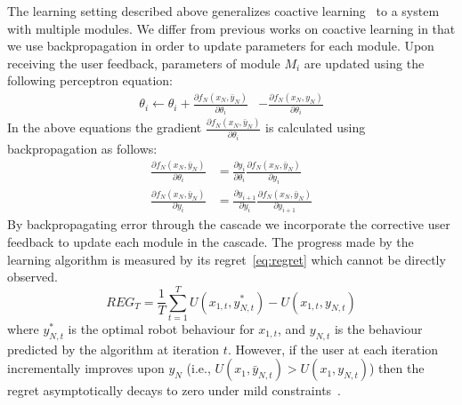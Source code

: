 The learning setting described above generalizes coactive learning~\citep{Jain13,Shivaswamy12} to a system with multiple modules. We differ from previous works on coactive learning in that we use  backpropagation in order to update parameters for each module. Upon receiving the user feedback, parameters of module $M_i$ are updated using the following perceptron equation:  
\begin{align}
\theta_i \leftarrow \theta_i +  \frac{\partial f_N(x_N,\bar{y}_N)}{\partial \theta_i} &- \frac{\partial f_N(x_N,{y}_N)}{\partial \theta_i}
\end{align}
In the above equations the	 gradient $\frac{\partial f_N(x_N,\bar{y}_N)}{\partial \theta_i}$ is calculated using backpropagation as follows:
\begin{align}
\frac{\partial f_N(x_N,\bar{y}_N)}{\partial \theta_i} &= \frac{\partial y_i}{\partial \theta_i}  \frac{\partial f_N(x_N,\bar{y}_N)	}{\partial y_{i}}\\
\frac{\partial f_N(x_N,\bar{y}_N)	}{\partial y_{i}} &= \frac{\partial y_{i+1}	}{\partial y_{i}} \frac{\partial f_N(x_N,\bar{y}_N)	}{\partial y_{i+1}}
\end{align}
By backpropagating error through the cascade we  incorporate the corrective user feedback to update each module in the cascade. The progress made by the learning algorithm is measured by its regret~\eqref{eq:regret} which cannot be directly observed.
\begin{equation}
\label{eq:regret}
REG_T = \frac{1}{T}\sum_{t=1}^T U(x_{1,t},y_{N,t}^*) - U(x_{1,t},y_{N,t}) 
\end{equation}
where $y_{N,t}^*$ is the optimal robot behaviour for $x_{1,t}$, and $y_{N,t}$ is the behaviour predicted by the algorithm at iteration $t$.  However, if the user at each iteration incrementally improves upon $y_N$ (i.e., $U(x_1,\bar{y}_{N,t}) > U(x_1,{y}_{N,t})$) then the regret asymptotically decays to zero under mild constraints~\citep{Shivaswamy12,Jain13}.  